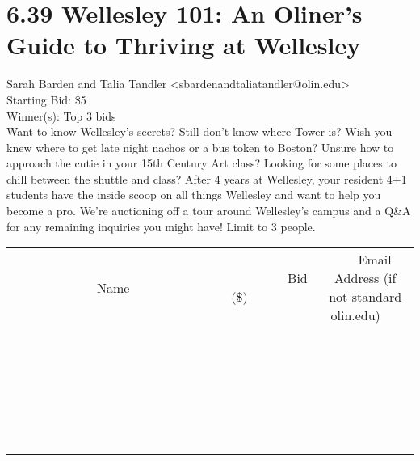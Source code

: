 \documentclass[11pt]{article}
\begin{document}
					\section*{6.39 Wellesley 101: An Oliner’s Guide to Thriving at Wellesley}
					Sarah Barden and Talia Tandler <sbardenandtaliatandler@olin.edu> \\
					Starting Bid: \$5 \\
					Winner(s): Top 3 bids \\
					Want to know Wellesley’s secrets? Still don’t know where Tower is? Wish you knew where to get late night nachos or a bus token to Boston? Unsure how to approach the cutie in your 15th Century Art class? Looking for some places to chill between the shuttle and class? After 4 years at Wellesley, your resident 4+1 students have the inside scoop on all things Wellesley and want to help you become a pro. We’re auctioning off a tour around Wellesley’s campus and a Q\&A for any remaining inquiries you might have! Limit to 3 people. \\
					[6ex]
					\begin{tabular}{c c c}
						~~~~~~~~~~~~~Name~~~~~~~~~~~~~ & ~~~~~~~~~Bid (\$)~~~~~~~~~ & ~~~Email Address (if not standard olin.edu)~~~ \\
				
 & & \\
\hline
 & & \\
\hline
 & & \\
\hline
 & & \\
\hline
 & & \\
\hline
 & & \\
\hline
 & & \\
\hline
 & & \\
\hline
 & & \\
\hline
 & & \\
\hline
 & & \\
\hline
 & & \\
\hline
 & & \\
\hline
 & & \\
\hline
 & & \\
\hline
 & & \\
\hline
 & & \\
\hline
 & & \\
\hline
 & & \\
\hline
 & & \\
\hline
 & & \\
\hline
 & & \\
\hline
 & & \\
\hline
 & & \\
\hline
 & & \\
\hline
 & & \\
\hline
					\end{tabular}
					\clearpage
				
\end{document}
